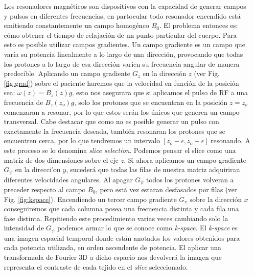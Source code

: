 Los resonadores magn\'eticos son dispositivos con la capacidad de generar 
campos y pulsos en diferentes frecuencias, en partocular todo resonador encendido
est\'a emitiendo constantemente un campo homog\'eneo $B_0$. 
El problema entonces es: c\'omo obtener el tiempo de relajaci\'on 
de un punto particular del cuerpo. Para esto es posible utilizar campos 
gradientes. Un campo gradiente es un campo que var\'ia su potencia linealmente
a lo largo de una direcci\'on, provocando que todas los protones a lo 
largo de esa direcci\'on var\'ien su frecuencia angular de manera predecible. 
Aplicando un campo gradiente $G_z$ en la direcci\'on $z$ (ver Fig. \ref{fig:grad})
sobre el paciente haremos que la velocidad en funci\'on de la posici\'on sea:
$\omega(z) = B_z(z) g$, esto nos asegurara que si aplicamos el pulso de RF a una
frecuencia de $B_z(z_o) g$, solo los protones que se encuentran en la posici\'on
$z=z_o$ comenzaran a resonar, por lo que estos ser\'an los \'unicos que generen un 
campo transversal. Cabe destacar que como no es posible generar un pulso con
exactamente la frecuencia deseada, tambi\'en resonaran los protones que se 
encuentren cerca, por lo que tendremos un intervalo $[z_o-\epsilon,z_o+\epsilon]$
resonando. A este proceso se lo denomina \textit{slice selection}. Podemos pensar 
el slice como una matriz de dos dimensiones sobre el eje $z$. Si ahora aplicamos
un campo gradiente $G_\psi$ en la direcci'on $y$, suceder\'a que todas las 
filas de nuestra matriz adquiriran diferentes velocidades angulares. Al apagar
$G_\psi$ todos los protones volveran a preceder respecto al campo $B_0$, pero
est\'a vez estaran desfasados por filas (ver Fig. \ref{fig:kspace}). Encendiendo
un tercer campo gradiente $G_\upsilon$ sobre la direcci\'on $x$ conseguiremos
que cada columna posea una frecuencia distinta y cada fila una fase distinta.
Repitiendo este procedimiento varias veces cambiando solo la intensidad de
$G_\psi$ podemos armar lo que se conoce como \textit{k-space}. El \textit{k-space}
es una imagen espacial temporal donde est\'an anotados los valores obtenidos para
cada potencia utilizada, en orden ascendente de potencia. El aplicar una
transformada de Fourier 3D a dicho espacio nos devolver\'a la imagen que
representa el contraste de cada tejido en el \textit{slice} seleccionado. \\

